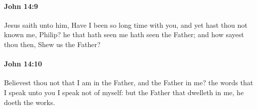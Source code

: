 		\paragraph{John 14:9} %
			\label{JOHN-14-9}

			Jesus saith unto him, Have I been so long time with you, and yet hast thou not known me, Philip? he that hath seen me hath seen the Father; and how sayest thou then, Shew us the Father?

			\begin{framed}
				\scriptsize
				\begin{compactdesc}
					\item[SBLG] 
				\end{compactdesc}
			\end{framed}

		\paragraph{John 14:10} %
			\label{JOHN-14-10}

			Believest thou not that I am in the Father, and the Father in me? the words that I speak unto you I speak not of myself: but the Father that dwelleth in me, he doeth the works.

